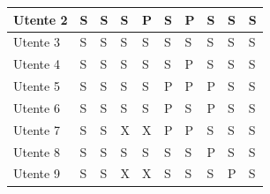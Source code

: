 \begin{table}[ht]
{\begin{tabular}{l|l|l|l|l|l|l|l|l|l|}
                \multicolumn{1}{|l|}{Utente 2} & S & S & S & P & S & P & S & S & S \\ \hline
                \multicolumn{1}{|l|}{Utente 3} & S & S & S & S & S & S & S & S & S \\ \hline
                \multicolumn{1}{|l|}{Utente 4} & S & S & S & S & S & P & S & S & S \\ \hline
                \multicolumn{1}{|l|}{Utente 5} & S & S & S & S & P & P & P & S & S \\ \hline
                \multicolumn{1}{|l|}{Utente 6} & S & S & S & S & P & S & P & S & S \\ \hline %
                \multicolumn{1}{|l|}{Utente 7} & S & S & X & X & P & P & S & S & S \\ \hline %
                \multicolumn{1}{|l|}{Utente 8} & S & S & S & S & S & S & P & S & S \\ \hline %
                \multicolumn{1}{|l|}{Utente 9} & S & S & X & X & S & S & S & P & S \\ \hline %
                \end{tabular}
                }
            \end{table}
            
